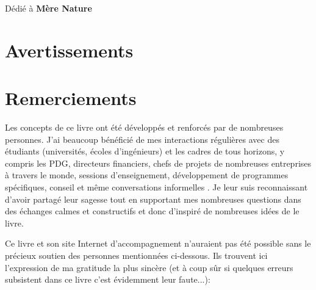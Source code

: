 \documentclass[12pt,a4paper,twoside,openright]{report}
\theoremstyle{definition}
\theoremstyle{itexmp}
\numberwithin{equation}{section}
\newenvironment{dedication}
  {\clearpage           %
   \thispagestyle{empty}%
   \vspace*{\stretch{1}}%
   \itshape             %
   \raggedleft          %
  }
  {\par %
   \vspace{\stretch{3}} %
   \clearpage           %
  }
\begin{document}
	\dominitoc
	\pagebreak
	\renewcommand{\contentsname}{Table of Contents}
	\tableofcontents
	\newpage\null\thispagestyle{empty}\newpage
	\setlength{\parskip}{12pt}
	\clearpage %
	\pagestyle{fancy} %
	\renewcommand{\chaptermark}[1]{\markboth{\thechapter.\space#1}{}}
	\renewcommand{\sectionmark}[1]{\markright{#1}}
	\fancyhead[LE,RO]{\nouppercase\leftmark~(\nouppercase\rightmark)} %
	\renewcommand{\footrulewidth}{1pt}
	\fancyfoot[C]{}
	\let\cleardoublepage\clearpage

	\begin{dedication}
	{\LARGE Dédié à \textbf{Mère Nature}}
	\end{dedication}

	\chapter{Avertissements}
	\minitoc
	
	
	
	\chapter{Remerciements}
	Les concepts de ce livre ont été développés et renforcés par de nombreuses personnes. J'ai beaucoup bénéficié de mes interactions régulières avec des étudiants (universités, écoles d'ingénieurs) et les cadres de tous horizons, y compris les PDG, directeurs financiers, chefs de projets de nombreuses entreprises à travers le monde, sessions d'enseignement, développement de programmes spécifiques, conseil et même conversations informelles . Je leur suis reconnaissant d'avoir partagé leur sagesse tout en supportant mes nombreuses questions dans des échanges calmes et constructifs et donc d'inspiré de nombreuses idées de le livre.

	Ce livre et son site Internet d'accompagnement n'auraient pas été possible sans le précieux soutien des personnes mentionnées ci-dessous. Ils trouvent ici l'expression de ma gratitude la plus sincère (et à coup sûr si quelques erreurs subsistent dans ce livre c'est évidemment leur faute...):
	
\end{document}
